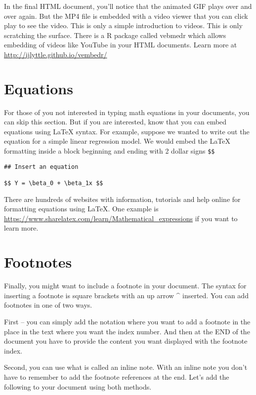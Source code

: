 \documentclass[
]{book}
\begin{document}
In the final HTML document, you'll notice that the animated GIF plays over and over again. But the MP4 file is embedded with a video viewer that you can click play to see the video. This is only a simple introduction to videos. This is only scratching the surface. There is a R package called vebmedr which allows embedding of videos like YouTube in your HTML documents. Learn more at \url{http://ijlyttle.github.io/vembedr/}

\hypertarget{equations}{%
\section{Equations}\label{equations}}

For those of you not interested in typing math equations in your documents, you can skip this section. But if you are interested, know that you can embed equations using LaTeX syntax. For example, suppose we wanted to write out the equation for a simple linear regression model. We would embed the LaTeX formatting inside a block beginning and ending with 2 dollar signs \texttt{\$\$}

\begin{verbatim}
## Insert an equation

$$ Y = \beta_0 + \beta_1x $$
\end{verbatim}

There are hundreds of websites with information, tutorials and help online for formatting equations using LaTeX. One example is \url{https://www.sharelatex.com/learn/Mathematical_expressions} if you want to learn more.

\hypertarget{footnotes}{%
\section{Footnotes}\label{footnotes}}

Finally, you might want to include a footnote in your document. The syntax for inserting a footnote is square brackets with an up arrow \^{} inserted. You can add footnotes in one of two ways.

First -- you can simply add the notation where you want to add a footnote in the place in the text where you want the index number. And then at the END of the document you have to provide the content you want displayed with the footnote index.

Second, you can use what is called an inline note. With an inline note you don't have to remember to add the footnote references at the end. Let's add the following to your document using both methods.
\end{document}
